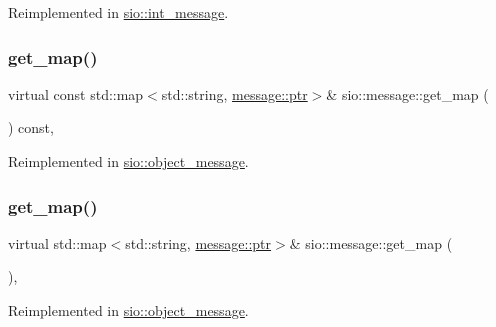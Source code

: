 Reimplemented in \hyperlink{classsio_1_1int__message_ad9159e1285bd3efd15b8f87699a9b133}{sio\+::int\+\_\+message}.

\mbox{\label{classsio_1_1message_a954a981a468fcea36ff19cce6ae7fd5e}} 
\subsubsection{\texorpdfstring{get\+\_\+map()}{get\_map()}\hspace{0.1cm}{\footnotesize\ttfamily [1/2]}}
{\footnotesize\ttfamily virtual const std\+::map$<$std\+::string, \hyperlink{classsio_1_1message_a6340b6fef57e4516eb17928b1885a615}{message\+::ptr}$>$\& sio\+::message\+::get\+\_\+map (\begin{DoxyParamCaption}{ }\end{DoxyParamCaption}) const\hspace{0.3cm}{\ttfamily [inline]}, {\ttfamily [virtual]}}



Reimplemented in \hyperlink{classsio_1_1object__message_a35d7f1d654b2a3b753ac01444635203e}{sio\+::object\+\_\+message}.

\mbox{\label{classsio_1_1message_a6ca4aee4616aa9dfde4de317d5efd125}} 
\subsubsection{\texorpdfstring{get\+\_\+map()}{get\_map()}\hspace{0.1cm}{\footnotesize\ttfamily [2/2]}}
{\footnotesize\ttfamily virtual std\+::map$<$std\+::string, \hyperlink{classsio_1_1message_a6340b6fef57e4516eb17928b1885a615}{message\+::ptr}$>$\& sio\+::message\+::get\+\_\+map (\begin{DoxyParamCaption}{ }\end{DoxyParamCaption})\hspace{0.3cm}{\ttfamily [inline]}, {\ttfamily [virtual]}}



Reimplemented in \hyperlink{classsio_1_1object__message_ac024fab0eb24248150ab318a4b937b4e}{sio\+::object\+\_\+message}.

